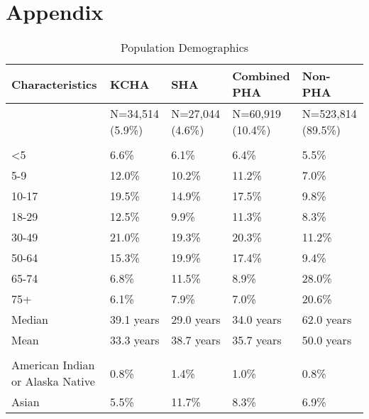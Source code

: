 \documentclass [11pt, proquest] {uwthesis}[2015/03/03]
\begin{document}
\chapter*{Appendix}\label{appendix}
\begin{table}

\caption{\label{tab:unnamed-chunk-1}Population Demographics}
\centering
\fontsize{12}{14}\selectfont
\begin{tabu} to 
\toprule
Characteristics & KCHA & SHA & Combined PHA & Non-PHA\\
\midrule
 & N=34,514 (5.9\%) & N=27,044  (4.6\%) & N=60,919  (10.4\%) & N=523,814 (89.5\%)\\
\addlinespace[0.3em]
\\
\hspace{1em}<5 & 6.6\% & 6.1\% & 6.4\% & 5.5\%\\
\hspace{1em}5-9 & 12.0\% & 10.2\% & 11.2\% & 7.0\%\\
\hspace{1em}10-17 & 19.5\% & 14.9\% & 17.5\% & 9.8\%\\
\hspace{1em}18-29 & 12.5\% & 9.9\% & 11.3\% & 8.3\%\\
\hspace{1em}30-49 & 21.0\% & 19.3\% & 20.3\% & 11.2\%\\
\hspace{1em}50-64 & 15.3\% & 19.9\% & 17.4\% & 9.4\%\\
\hspace{1em}65-74 & 6.8\% & 11.5\% & 8.9\% & 28.0\%\\
\hspace{1em}75+ & 6.1\% & 7.9\% & 7.0\% & 20.6\%\\
\hspace{1em}Median & 39.1 years & 29.0 years & 34.0 years & 62.0 years\\
\hspace{1em}Mean & 33.3 years & 38.7 years & 35.7 years & 50.0 years\\
\addlinespace[0.3em]
\\
\hspace{1em}American Indian or Alaska Native & 0.8\% & 1.4\% & 1.0\% & 0.8\%\\
\hspace{1em}Asian & 5.5\% & 11.7\% & 8.3\% & 6.9\%\\

\end{tabu}
\end{table}
\end{document}
